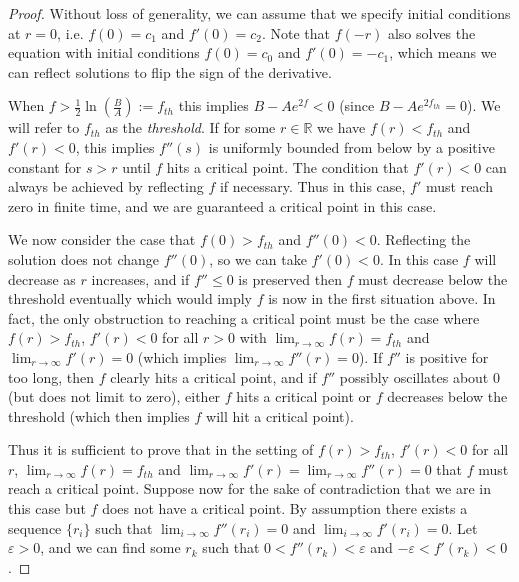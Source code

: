 \documentclass[10pt,a4paper]{amsart}
\newcommand{\R}{\mathbb{R}}
\renewcommand{\epsilon}{\varepsilon}
\begin{document}
\begin{proof}
  Without loss of generality, we can assume that we specify initial conditions at $r=0$, i.e. $f(0)=c_1$ and $f'(0)=c_2$. Note that $f(-r)$ also solves the equation with initial conditions $f(0)=c_0$ and $f'(0)=-c_1$, which means we can reflect solutions to flip the sign of the derivative. 

  When $f>\tfrac{1}{2}\ln(\tfrac{B}{A}):=f_{th}$ this implies $B-Ae^{2f}<0$ (since $B-Ae^{2f_{th}}=0$). We will refer to $f_{th}$ as the \textit{threshold}. If for some $r\in\R$ we have $f(r)<f_{th}$ and $f'(r)<0$, this implies $f''(s)$ is uniformly bounded from below by a positive constant for $s>r$ until $f$ hits a critical point. The condition that $f'(r)<0$ can always be achieved by reflecting $f$ if necessary. Thus in this case, $f'$ must reach zero in finite time, and we are guaranteed a critical point in this case.

  We now consider the case that $f(0)>f_{th}$ and $f''(0)<0$. Reflecting the solution does not change $f''(0)$, so we can take $f'(0)<0$. In this case $f$ will decrease as $r$ increases, and if $f''\leq 0$ is preserved then $f$ must decrease below the threshold eventually which would imply $f$ is now in the first situation above. In fact, the only obstruction to reaching a critical point must be the case where $f(r)>f_{th}$, $f'(r)<0$ for all $r>0$ with $\lim_{r\to\infty}f(r)=f_{th}$ and $\lim_{r\to\infty}f'(r)=0$ (which implies $\lim_{r\to\infty}f''(r)=0$). If $f''$ is positive for too long, then $f$ clearly hits a critical point, and if $f''$ possibly oscillates about 0 (but does not limit to zero), either $f$ hits a critical point or $f$ decreases below the threshold (which then implies $f$ will hit a critical point).

  Thus it is sufficient to prove that in the setting of $f(r)>f_{th}$, $f'(r)<0$ for all $r$, $\lim_{r\to\infty}f(r)=f_{th}$ and $\lim_{r\to\infty}f'(r)=\lim_{r\to\infty}f''(r)=0$ that $f$ must reach a critical point. Suppose now for the sake of contradiction that we are in this case but $f$ does not have a critical point. By assumption there exists a sequence $\{r_{i}\}$ such that $\lim_{i\to\infty}f''(r_{i})=0$ and $\lim_{i\to\infty}f'(r_{i})=0$. Let $\epsilon>0$, and we can find some $r_{k}$ such that $0<f''(r_{k})<\epsilon$ and $-\epsilon<f'(r_{k})<0$. 


\end{proof}
\end{document}

